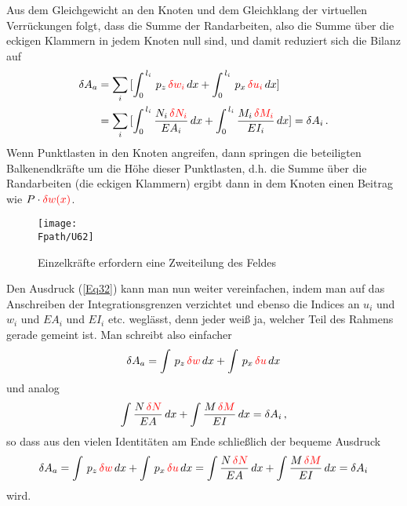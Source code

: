 {{{{Aus dem Gleichgewicht an den Knoten und dem Gleichklang der
virtuellen Verr\"{u}ckungen folgt, dass die Summe der Randarbeiten, also die Summe \"{u}ber die eckigen Klammern in jedem Knoten null sind, und damit reduziert sich die Bilanz auf
\begin{align}\label{Eq32}
\delta A_a &= \sum_i\,[\int_0^{\,l_i} \,p_z\,\textcolor{red}{\delta w_i}\,dx + \int_0^{\,l_i} \,p_x\, \textcolor{red}{\delta u_i}\,dx]\nonumber \\
 &= \sum_i\, [\int_0^{\,l_i} \frac{N_i\,\textcolor{red}{\delta N_i}}{EA_i}\,dx + \int_0^{\,l_i} \frac{M_i\,\textcolor{red}{\delta M_i}}{EI_i}\,dx ] = \delta A_i\,.
\end{align}
Wenn Punktlasten in den Knoten angreifen, dann springen die beteiligten Balken\-endkr\"{a}fte um die H\"{o}he dieser Punktlasten, d.h. die Summe \"{u}ber die Randarbeiten (die eckigen Klammern) ergibt dann in dem Knoten einen  Beitrag wie $P\cdot\textcolor{red}{\delta w(x)}$.
\begin{figure}[tbp]
\centering
\if {} \sidecaption \fi
\texttt{[image: \\Fpath/U62]}
\caption{Einzelkr\"{a}fte erfordern eine Zweiteilung des Feldes} \label{U62}
\end{figure}%



Den Ausdruck (\ref{Eq32}) kann man nun weiter vereinfachen, indem man auf das Anschreiben der Integrationsgrenzen verzichtet und ebenso die Indices an $u_i$ und $w_i$ und $EA_i$ und $EI_i$ etc. wegl\"{a}sst, denn jeder wei{\ss} ja, welcher Teil des Rahmens gerade gemeint ist. Man schreibt also einfacher
\begin{align}
\delta A_a = \int \,p_z\,\textcolor{red}{\delta w}\,dx + \int \,p_x\, \textcolor{red}{\delta u}\,dx
\end{align}
und analog
\begin{align}
\int \frac{N\,\textcolor{red}{\delta N}}{EA} \,dx + \int \frac{M\,\textcolor{red}{\delta M}}{EI}\,dx = \delta A_i\,,
\end{align}
so dass aus den vielen Identit\"{a}ten am Ende schlie{\ss}lich der bequeme Ausdruck
\begin{align}
\delta A_a = \int \,p_z\,\textcolor{red}{\delta w}\,dx + \int \,p_x\, \textcolor{red}{\delta u}\,dx = \int \frac{N\,\textcolor{red}{\delta N}}{EA} \,dx + \int \frac{M\,\textcolor{red}{\delta M}}{EI}\,dx = \delta A_i
\end{align}
wird.

}}}}
